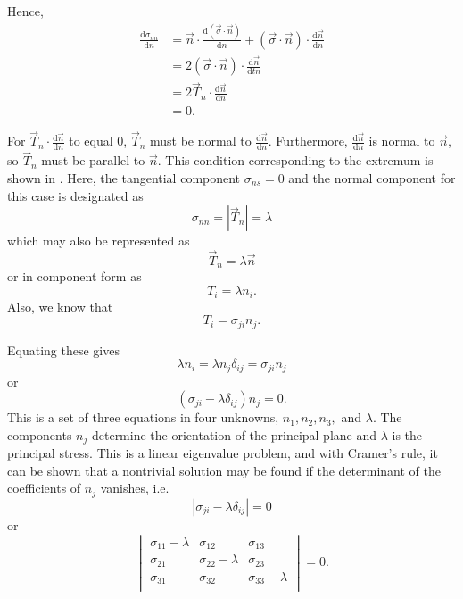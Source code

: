 Hence,
\begin{align*}
  \frac{\mathrm{d}\sigma_{nn}}{\mathrm{d}n} &= \Vec{n} \cdot \frac{\mathrm{d}(\Vec{\sigma} \cdot \Vec{n})}{\mathrm{d}n} + (\Vec{\sigma} \cdot \Vec{n}) \cdot \frac{\mathrm{d}\Vec{n}}{\mathrm{d}n} \\
  &= 2 (\Vec{\sigma} \cdot \Vec{n}) \cdot \frac{\mathrm{d}\Vec{n}}{\mathrm{d}tn}  \\
  &= 2 \Vec{T}_n \cdot \frac{\mathrm{d}\Vec{n}}{\mathrm{d}n}  \\
  &= 0
.\end{align*}

For $\Vec{T}_n \cdot \frac{\mathrm{d}\Vec{n}}{\mathrm{d}n}$ to equal 0, $\Vec{T}_n$ must be normal to $\frac{\mathrm{d}\Vec{n}}{\mathrm{d}n}$.
Furthermore, $\frac{\mathrm{d}\Vec{n}}{\mathrm{d}n} $ is normal to $\Vec{n}$, so $\Vec{T}_n$ must be parallel to $\Vec{n}$.
This condition corresponding to the extremum is shown in .
Here, the tangential component $\sigma_{ns} = 0$ and the normal component for this case is designated as
\begin{equation*}
  \sigma_{nn} = \left| \Vec{T}_n \right| = \lambda
\end{equation*}
which may also be represented as
\begin{equation*}
  \Vec{T}_n = \lambda \Vec{n}
\end{equation*}
or in component form as
\begin{equation*}
  T_i = \lambda n_i
.\end{equation*}
Also, we know that
\begin{equation*}
  T_i = \sigma_{ji} n_j
.\end{equation*}

Equating these gives
\begin{equation*}
  \lambda n_i = \lambda n_j \delta_{ij} = \sigma_{ji} n_j
\end{equation*}
or
\begin{equation} \label{eq:prinor}
  \left( \sigma_{ji} - \lambda \delta_{ij} \right) n_j = 0
.\end{equation}
This is a set of three equations in four unknowns, $n_1, n_2, n_3,$ and $\lambda$.
The components $n_j$ determine the orientation of the principal plane and $\lambda$ is the principal stress.
This is a linear eigenvalue problem, and with Cramer's rule, it can be shown that a nontrivial solution may be found if the determinant of the coefficients of $n_j$ vanishes, i.e.
\begin{equation*}
  \left| \sigma_{ji} - \lambda \delta_{ij} \right| = 0
\end{equation*}
or
\begin{equation*}
  \begin{vmatrix}
    \sigma_{11}-\lambda & \sigma_{12} & \sigma_{13}\\
  \sigma_{21} & \sigma_{22}-\lambda & \sigma_{23}\\
  \sigma_{31} & \sigma_{32} & \sigma_{33}-\lambda\\
  \end{vmatrix} = 0
.\end{equation*}


